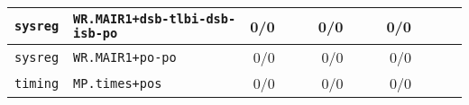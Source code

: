 \begin{tabular}{l l  | r r l | r r l | r r l l}
         \verb|sysreg| &                         \verb|WR.MAIR1+dsb-tlbi-dsb-isb-po| &            0/0 &                       &                   &            0/0 &                       &                   &            0/0 &                       &                    & \\ \hline 
         \verb|sysreg| &                                       \verb|WR.MAIR1+po-po| &            0/0 &                       &                   &            0/0 &                       &                   &            0/0 &                       &                    & \\ \hline 
         \verb|timing| &                                         \verb|MP.times+pos| &            0/0 &                       &                   &            0/0 &                       &                   &            0/0 &                       &                    & \\ \hline 
\end{tabular}
